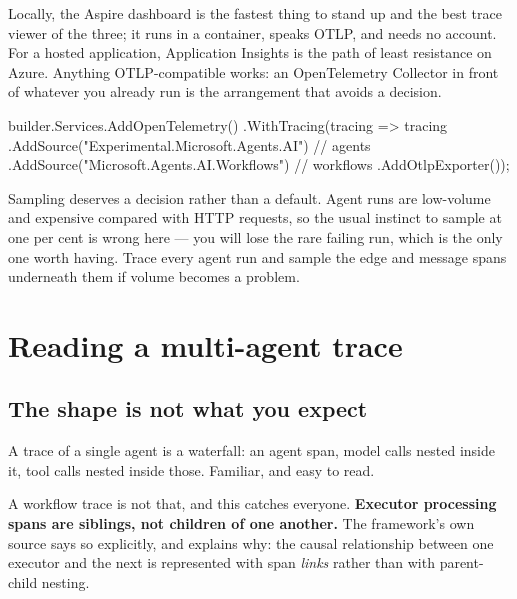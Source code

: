 Locally, the Aspire dashboard is the fastest thing to stand up and the best trace
viewer of the three; it runs in a container, speaks OTLP, and needs no account.
For a hosted application, Application Insights is the path of least resistance on
Azure. Anything OTLP-compatible works: an OpenTelemetry Collector in front of
whatever you already run is the arrangement that avoids a decision.

\begin{csharp}[caption={Wiring up tracing}, label={lst:obs-wireup}]
builder.Services.AddOpenTelemetry()
    .WithTracing(tracing => tracing
        .AddSource("Experimental.Microsoft.Agents.AI")   // agents
        .AddSource("Microsoft.Agents.AI.Workflows")      // workflows
        .AddOtlpExporter());
\end{csharp}

\begin{note}
Sampling deserves a decision rather than a default. Agent runs are low-volume and
expensive compared with HTTP requests, so the usual instinct to sample at one per
cent is wrong here --- you will lose the rare failing run, which is the only one
worth having. Trace every agent run and sample the edge and message spans
underneath them if volume becomes a problem.
\end{note}

\section{Reading a multi-agent trace}
\label{sec:obs-reading}

\subsection{The shape is not what you expect}

A trace of a single agent is a waterfall: an agent span, model calls nested
inside it, tool calls nested inside those. Familiar, and easy to read.

A workflow trace is not that, and this catches everyone. \textbf{Executor
processing spans are siblings, not children of one another.} The framework's own
source says so explicitly, and explains why: the causal relationship between one
executor and the next is represented with span \emph{links} rather than with
parent-child nesting.

